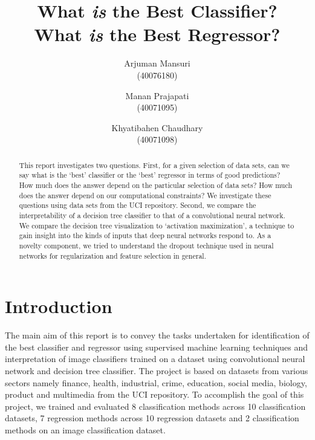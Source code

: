 \documentclass[10pt,twocolumn,letterpaper]{article}
\begin{document}
\title{What {\em is} the Best Classifier?\\
       What {\em is} the Best Regressor?}
\author{Arjuman Mansuri\\(40076180) \and Manan Prajapati\\(40071095) \and Khyatibahen Chaudhary\\(40071098)}
\maketitle

\begin{abstract}
   This report investigates two questions.
   First, for a given selection of data sets, can we say what
   is the `best' classifier or the `best' regressor in terms
   of good predictions?
   How much does the answer depend on the particular selection of data sets?
   How much does the answer depend on our computational constraints?
   We investigate these questions using data sets from the UCI repository.
   Second, we compare the interpretability of a decision tree
   classifier to that of a convolutional neural network.
   We compare the decision tree visualization
   to `activation maximization', a technique to gain insight into
   the kinds of inputs that deep neural networks respond to.
   As a novelty component, we tried to understand the dropout technique used in neural networks for regularization and feature selection in general.
\end{abstract}



\section{Introduction}

The main aim of this report is to convey the tasks undertaken for identification
of the best classifier and regressor using supervised machine learning
techniques and interpretation of image classifiers trained on a dataset using
convolutional neural network and decision tree classifier. The project is based
on datasets from various sectors namely finance, health, industrial, crime,
education, social media, biology, product and multimedia from the UCI
repository. To accomplish the goal of this project, we trained and evaluated 8
classification methods across 10 classification datasets, 7 regression methods
across 10 regression datasets and 2 classification methods on an image
classification dataset.
\end{document}
